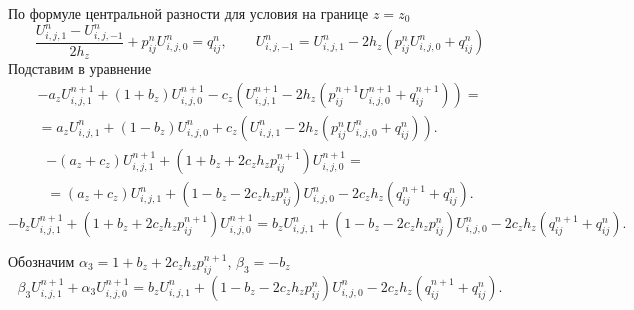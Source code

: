 \documentclass[a4paper,12pt]{article}
\begin{document}
По формуле центральной разности для условия на границе $z = z_0$
\begin{equation*}
  \frac{U^{n}_{i,j,1} -  U^{n}_{i,j,-1}}{2 h_z} + p_{ij}^n U^n_{i,j,0}  = q_{ij}^{n}, \qquad
  U^{n}_{i,j,-1}  = U^{n}_{i,j,1} - 2 h_z \left( p_{ij}^n U^n_{i,j,0} + q_{ij}^{n} \right)
\end{equation*}
Подставим в уравнение
\begin{multline*}
  - a_z U^{n+1}_{i,j,1} + \left( 1 + b_z  \right) U^{n+1}_{i,j,0} - c_z \left( U^{n+1}_{i,j,1} - 2 h_z (p^{n+1}_{ij} U^{n+1}_{i,j,0} + q_{ij}^{n+1}) \right) = \\
  = a_z U^{n}_{i,j,1} + \left(1 - b_z \right) U^{n}_{i,j,0} + c_z \left(  U^{n}_{i,j,1} - 2 h_z (p^{n}_{ij} U^{n}_{i,j,0} + q_{ij}^{n}) \right).
\end{multline*}
\begin{multline*}
  - (a_z + c_z) U^{n+1}_{i,j,1} + \left( 1 + b_z + 2 c_z h_z p^{n+1}_{ij} \right) U^{n+1}_{i,j,0} = \\
  = (a_z + c_z) U^{n}_{i,j,1} + \left(1 - b_z - 2 c_z h_z p^{n}_{ij} \right) U^{n}_{i,j,0} - 2 c_z h_z (q_{ij}^{n+1} + q_{ij}^{n}).
\end{multline*}
\begin{equation}
  - b_z U^{n+1}_{i,j,1} + \left( 1 + b_z  + 2 c_z h_z p^{n+1}_{ij} \right) U^{n+1}_{i,j,0} =
  b_z U^{n}_{i,j,1} + \left(1 - b_z - 2 c_z h_z p^{n}_{ij} \right) U^{n}_{i,j,0} - 2 c_z h_z (q_{ij}^{n+1} + q_{ij}^{n}).
\end{equation}

Обозначим $\alpha_3 = 1 + b_z  + 2 c_z h_z p^{n+1}_{ij}$, $ \beta_3 = - b_z$
\begin{equation}
  \label{eq:3d-bc3-z0}
  \beta_3 U^{n+1}_{i,j,1} + \alpha_3 U^{n+1}_{i,j,0} =
  b_z U^{n}_{i,j,1} + \left(1 - b_z - 2 c_z h_z p^{n}_{ij} \right) U^{n}_{i,j,0} - 2 c_z h_z (q_{ij}^{n+1} + q_{ij}^{n}).
\end{equation}
\end{document}
